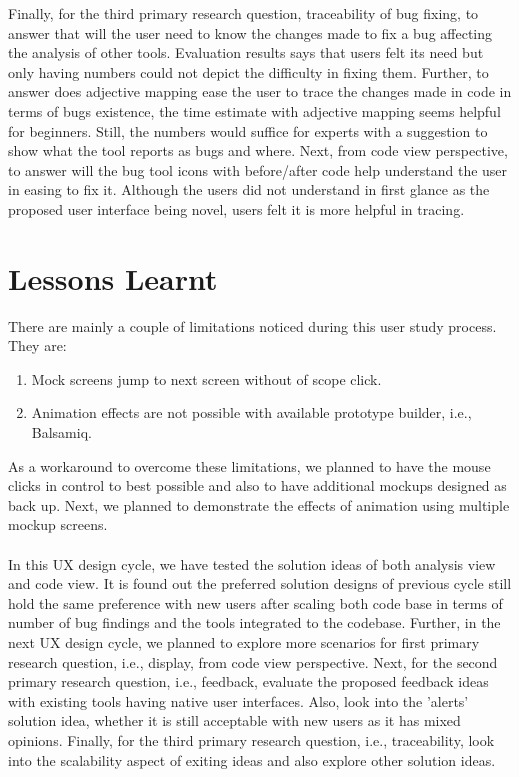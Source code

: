 Finally, for the third primary research question, traceability of bug fixing, to answer that will the user need to know the changes made to fix a bug affecting the analysis of other tools. Evaluation results says that users felt its need but only having numbers could not depict the difficulty in fixing them. Further, to answer does adjective mapping ease the user to trace the changes made in code in terms of bugs existence, the time estimate with adjective mapping seems helpful for beginners. Still, the numbers would suffice for experts with a suggestion to show what the tool reports as bugs and where. Next, from code view perspective, to answer will the bug tool icons with before/after code help understand the user in easing to fix it. Although the users did not understand in first glance as the proposed user interface being novel, users felt it is more helpful in tracing. \\

\section{Lessons Learnt}

There are mainly a couple of limitations noticed during this user study process. They are: \\

\begin{enumerate}
\item Mock screens jump to next screen without of scope click.
\item Animation effects are not possible with available prototype builder, i.e., Balsamiq. \\
\end{enumerate}

As a workaround to overcome these limitations, we planned to have the mouse clicks in control to best possible and also to have additional mockups designed as back up. Next, we planned to demonstrate the effects of animation using multiple mockup screens. \\ \\

In this UX design cycle, we have tested the solution ideas of both analysis view and code view. It is found out the preferred solution designs of previous cycle still hold the same preference with new users after scaling both code base in terms of number of bug findings and the tools integrated to the codebase. Further, in the next UX design cycle, we planned to explore more scenarios for first primary research question, i.e., display, from code view perspective. Next, for the second primary research question, i.e., feedback, evaluate the proposed feedback ideas with existing tools having native user interfaces. Also, look into the 'alerts' solution idea, whether it is still acceptable with new users as it has mixed opinions. Finally, for the third primary research question, i.e., traceability, look into the scalability aspect of exiting ideas and also explore other solution ideas.